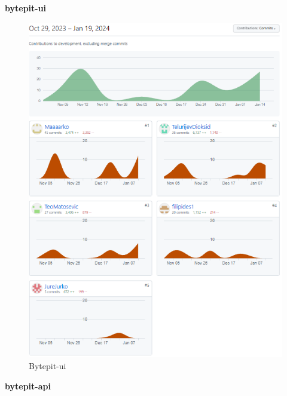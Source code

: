 		\begin{packed_enum}
			\item \textbf{bytepit-ui}
			
			\begin{figure}[H]
				\includegraphics[scale=0.75]{slike/bp-ui-contr.PNG} 
				\centering
				\caption{Bytepit-ui}
				\label{fig:bytepit-ui}
			\end{figure}
			
			\eject
			
			\item \textbf{bytepit-api}
			

\end{packed_enum}
